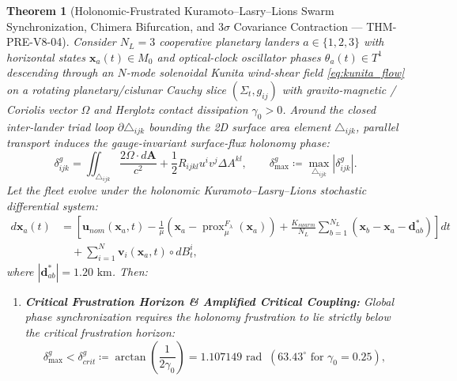 \documentclass[11pt,a4paper,reqno]{article}
\def\bm#1{#1}%
\def\texttt#1{#1}%
\def\mathrm#1{#1}%
\def\mathcal#1{#1}%
\def\mathbb#1{#1}%
\theoremstyle{plain}
\newtheorem{theorem}{Theorem}[section]
\theoremstyle{definition}
\theoremstyle{remark}
\numberwithin{equation}{section}
\begin{document}
\begin{theorem}[{Holonomic-Frustrated Kuramoto--Lasry--Lions Swarm Synchronization, Chimera Bifurcation, and $3\sigma$ Covariance Contraction --- \texttt{THM-PRE-V8-04}}]\label{thm:swarm_edl_dispersion}
Consider $N_L = 3$ cooperative planetary landers $a \in \{1, 2, 3\}$ with horizontal states $\mathbf{x}_a(t) \in \mathcal{M}_0$ and optical-clock oscillator phases $\theta_a(t) \in \mathbb{T}^1$ descending through an $N$-mode solenoidal Kunita wind-shear field \eqref{eq:kunita_flow} on a rotating planetary/cislunar Cauchy slice $(\Sigma_t, g_{ij})$ with gravito-magnetic / Coriolis vector $\bm{\Omega}$ and Herglotz contact dissipation $\gamma_0 > 0$. Around the closed inter-lander triad loop $\partial\triangle_{ijk}$ bounding the 2D surface area element $\triangle_{ijk}$, parallel transport induces the gauge-invariant surface-flux holonomy phase:
\begin{equation}\label{eq:sagnac_surface_flux_spde_v4}
  \delta_{ijk}^g = \iint_{\triangle_{ijk}} \frac{2\bm{\Omega} \cdot \mathrm{d}\mathbf{A}}{c^2} + \frac{1}{2} R_{ijkl} u^i v^j \Delta A^{kl}, \qquad \delta_{\max}^g \coloneqq \max_{\triangle_{ijk}} |\delta_{ijk}^g|.
\end{equation}
Let the fleet evolve under the holonomic Kuramoto--Lasry--Lions stochastic differential system:
\begin{align}\label{eq:swarm_edl_sde}
  \mathrm{d}\mathbf{x}_a(t) &= \left[ \mathbf{u}_{\mathrm{nom}}(\mathbf{x}_a, t) - \frac{1}{\mu}\!\left(\mathbf{x}_a - \operatorname{prox}_\mu^{\mathcal{F}_\lambda}(\mathbf{x}_a)\right) + \frac{K_{\mathrm{swarm}}}{N_L}\sum_{b=1}^{N_L} \left( \mathbf{x}_b - \mathbf{x}_a - \mathbf{d}_{ab}^* \right) \right]\mathrm{d}t \nonumber \\
  &\quad + \sum_{i=1}^N \mathbf{v}_i(\mathbf{x}_a, t) \circ \mathrm{d}B_t^i,
\end{align}
where $|\mathbf{d}_{ab}^*| = 1.20\text{ km}$. Then:
\begin{enumerate}[label=\textbf{(\arabic*)}, leftmargin=2.0em]
  \item \textbf{Critical Frustration Horizon \& Amplified Critical Coupling:} Global phase synchronization requires the holonomy frustration to lie strictly below the critical frustration horizon:
  \begin{equation}\label{eq:critical_frustration_spde_v4}
    \delta_{\max}^g < \delta_{\mathrm{crit}}^g \coloneqq \arctan\!\left(\frac{1}{2\gamma_0}\right) = 1.107149\text{ rad} \;\; (63.43^\circ \text{ for } \gamma_0 = 0.25),
  \end{equation}

\end{enumerate}
\end{theorem}
\end{document}
